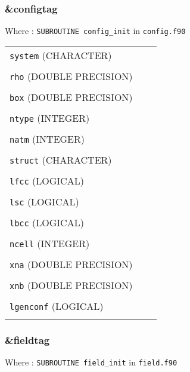 \documentclass[10pt,a4paper]{article}
\begin{document}
\subsubsection{\&configtag}

Where : \verb?SUBROUTINE config_init? in \verb?config.f90?

\begin{tabular}{lcc}
\\
\verb?system? (CHARACTER) & \\
\\
\verb?rho? (DOUBLE PRECISION)  & \\
\\
\verb?box? (DOUBLE PRECISION)  & \\
\\
\verb?ntype? (INTEGER)  & \\
\\
\verb?natm? (INTEGER) & \\
\\
\verb?struct? (CHARACTER) & \\
\\
\verb?lfcc? (LOGICAL) & \\
\\
\verb?lsc? (LOGICAL) & \\
\\
\verb?lbcc? (LOGICAL) & \\
\\
\verb?ncell? (INTEGER) & \\
\\
\verb?xna? (DOUBLE PRECISION) & \\
\\
\verb?xnb? (DOUBLE PRECISION) & \\
\\
\verb?lgenconf? (LOGICAL) & \\
\\
\end{tabular}


\subsubsection{\&fieldtag}

Where : \verb?SUBROUTINE field_init? in \verb?field.f90?
\end{document}

